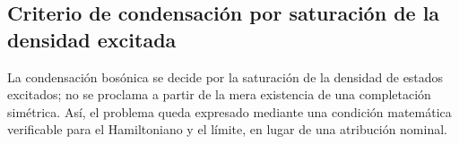 \subsection{Criterio de condensación por saturación de la densidad excitada}
\label{v:rec:fock_gibbs:section:06}

La condensación bosónica se
decide por la saturación de la densidad de estados excitados; no se proclama a
partir de la mera existencia de una completación simétrica. Así, el problema
queda expresado mediante una condición matemática verificable para el
Hamiltoniano y el límite, en lugar de una atribución nominal.
